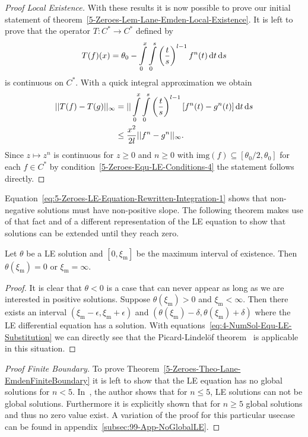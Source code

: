 \begin{proof}[Proof  Local Existence]
	With these results it is now possible to prove our initial statement of theorem~\ref{5-Zeroes-Lem-Lane-Emden-Local-Existence}.
	It is left to prove that the operator $T:C^*\rightarrow C^*$ defined by
	\begin{equation}
		T(f)(x) = \theta_0 - \int\limits_0^x\int\limits_0^s \left(\frac{t}{s}\right)^{l-1}f^n(t)\mathop{}\!\mathrm{d} t\mathop{}\!\mathrm{d} s
		\label{eq:5-Zeroes-LE-Definition-Operator-On-C-Star}
	\end{equation}
	is continuous on $C^*$.
	With a quick integral approximation we obtain
	\begin{align}
		||T(f)-T(g)||_{\infty} &= ||\int\limits_0^x\int\limits_0^s \left(\frac{t}{s}\right)^{l-1}\left[f^n(t)-g^n(t)\right]\mathop{}\!\mathrm{d} t\mathop{}\!\mathrm{d} s\\
		&\leq \frac{x^2}{2l}||f^n-g^n||_{\infty}.
	\end{align}
	Since $z\mapsto z^n$ is continuous for $z\geq0$ and $n\geq0$ with $\mathrm{img}(f)\subseteq[\theta_0/2,\theta_0]$ for each $f\in C^*$ by condition~\eqref{5-Zeroes-Equ-LE-Conditions-4} the statement follows directly.
\end{proof}\noindent
Equation~\eqref{eq:5-Zeroes-LE-Equation-Rewritten-Integration-1} shows that non-negative solutions must have non-positive slope.
The following theorem makes use of that fact and of a different representation of the \ac{LE} equation to show that solutions can be extended until they reach zero.
\begin{lemma}
	Let $\theta$ be a \ac{LE} solution and $[0,\xi_\textrm{m}]$ be the maximum interval of existence.
	Then $\theta(\xi_\textrm{m})=0$ or $\xi_\textrm{m}=\infty$.
\end{lemma}
\begin{proof}
	It is clear that $\theta<0$ is a case that can never appear as long as we are interested in positive solutions.
	Suppose $\theta(\xi_\textrm{m})>0$ and $\xi_\textrm{m}<\infty$.
	Then there exists an interval $(\xi_\textrm{m}-\epsilon,\xi_\textrm{m}+\epsilon)$ and $(\theta(\xi_\textrm{m})-\delta,\theta(\xi_\textrm{m})+\delta)$ where the \ac{LE} differential equation has a solution.
	With equations~\ref{eq:4-NumSol-Equ-LE-Substitution} we can directly see that the Picard-Lindelöf theorem~\cite{lindelofApplicationMethodeApproximations1894} is applicable in this situation.
\end{proof}
\begin{proof}[Proof  Finite Boundary]
	To prove Theorem~\ref{5-Zeroes-Theo-Lane-EmdenFiniteBoundary} it is left to show that the \ac{LE} equation has no global solutions for $n<5$.
	In~\cite[p.~36]{quittnerSuperlinearParabolicProblems2007}, the author shows that for $n\leq5$, \ac{LE} solutions can not be global solutions.
	Furthermore it is explicitly shown that for $n\geq5$ global solutions and thus no zero value exist.
	A variation of the proof for this particular usecase can be found in appendix~\ref{subsec:99-App-NoGlobalLE}.
\end{proof}
%
%
